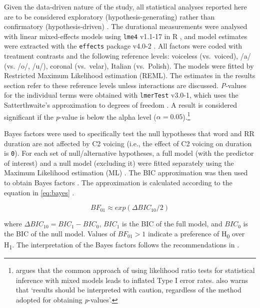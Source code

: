 \documentclass[preprint]{JASAnew}
\begin{document}
Given the data-driven nature of the study, all statistical analyses
reported here are to be considered exploratory (hypothesis-generating)
rather than confirmatory (hypothesis-driven)
\citep{kerr1998, gelman2013, roettger2018}. The durational measurements
were analysed with linear mixed-effects models using \texttt{lme4}
v1.1-17 in R \citep{bates2015}, and model estimates were extracted with
the \texttt{effects} package v4.0-2 \citep{fox2003}. All factors were
coded with treatment contrasts and the following reference levels:
voiceless (vs.~voiced), /a/ (vs. /o/, /u/), coronal (vs.~velar), Italian
(vs.~Polish). The models were fitted by Restricted Maximum Likelihood
estimation (REML). The estimates in the results section refer to these
reference levels unless interactions are discussed. \emph{P}-values for
the individual terms were obtained with \texttt{lmerTest} v3.0-1, which
uses the Satterthwaite's approximation to degrees of freedom
\citep{kuznetsova2017, luke2017}. A result is considered significant if
the \emph{p}-value is below the alpha level
(\(\alpha = 0.05\)).\footnote{\citet{luke2017} argues that the common approach of using likelihood ratio tests for statistical inference with mixed models leads to inflated Type I error rates. \citet[1501]{luke2017} also warns that `results should be interpreted with caution, regardless of the method adopted for obtaining \textit{p}-values'.}

Bayes factors were used to specifically test the null hypotheses that
word and RR duration are not affected by C2 voicing (i.e., the effect of
C2 voicing on duration is \texttt{0}). For each set of null/alternative
hypotheses, a full model (with the predictor of interest) and a null
model (excluding it) were fitted separately using the Maximum Likelihood
estimation (ML) \citep[p.~34]{bates2015}. The BIC approximation was then
used to obtain Bayes factors
\citep{raftery1995, raftery1999, wagenmakers2007, jarosz2014}. The
approximation is calculated according to the equation in \ref{eq:bayes}
\citep[p.~796]{wagenmakers2007}.

\begin{equation}
\label{eq:bayes}
BF_{01} \approx exp(\Delta{}BIC_{10}/2)
\end{equation}

where \(\Delta{}BIC_{10} = BIC_1 - BIC_0\), \(BIC_1\) is the BIC of the
full model, and \(BIC_0\) is the BIC of the null model. Values of
\(BF_{01} > 1\) indicate a preference of H\textsubscript{0} over
H\textsubscript{1}. The interpretation of the Bayes factors follows the
recommendations in \citet[p.~139]{raftery1995}.
\end{document}
